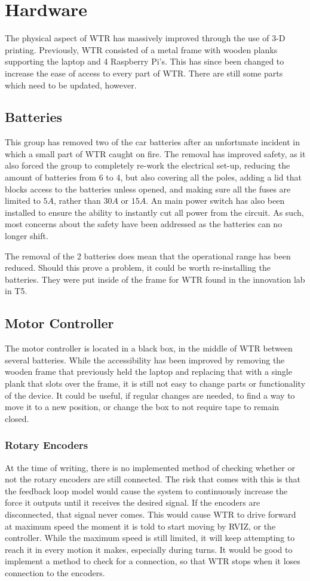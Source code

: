 \section{Hardware}
The physical aspect of WTR has massively improved through the use of 3-D printing.
Previously, WTR consisted of a metal frame with wooden planks supporting the laptop and 4 Raspberry Pi's.
This has since been changed to increase the ease of access to every part of WTR.
There are still some parts which need to be updated, however.

\subsection{Batteries}
This group has removed two of the car batteries after an unfortunate incident in which a small part of WTR caught on fire.
The removal has improved safety, as it also forced the group to completely re-work the electrical set-up, reducing the amount of batteries from 6 to 4, but also covering all the poles, adding a lid that blocks access to the batteries unless opened, and making sure all the fuses are limited to $5A$, rather than $30A$ or $15A$.
An main power switch has also been installed to ensure the ability to instantly cut all power from the circuit.
As such, most concerns about the safety have been addressed as the batteries can no longer shift.

The removal of the 2 batteries does mean that the operational range has been reduced.
Should this prove a problem, it could be worth re-installing the batteries.
They were put inside of the frame for WTR found in the innovation lab in T5.

\subsection{Motor Controller}
The motor controller is located in a black box, in the middle of WTR between several batteries.
While the accessibility has been improved by removing the wooden frame that previously held the laptop and replacing that with a single plank that slots over the frame, it is still not easy to change parts or functionality of the device.
It could be useful, if regular changes are needed, to find a way to move it to a new position, or change the box to not require tape to remain closed.

\subsubsection{Rotary Encoders}
At the time of writing, there is no implemented method of checking whether or not the rotary encoders are still connected.
The risk that comes with this is that the feedback loop model would cause the system to continuously increase the force it outputs until it receives the desired signal.
If the encoders are disconnected, that signal never comes.
This would cause WTR to drive forward at maximum speed the moment it is told to start moving by RVIZ, or the controller.
While the maximum speed is still limited, it will keep attempting to reach it in every motion it makes, especially during turns.
It would be good to implement a method to check for a connection, so that WTR stops when it loses connection to the encoders.

